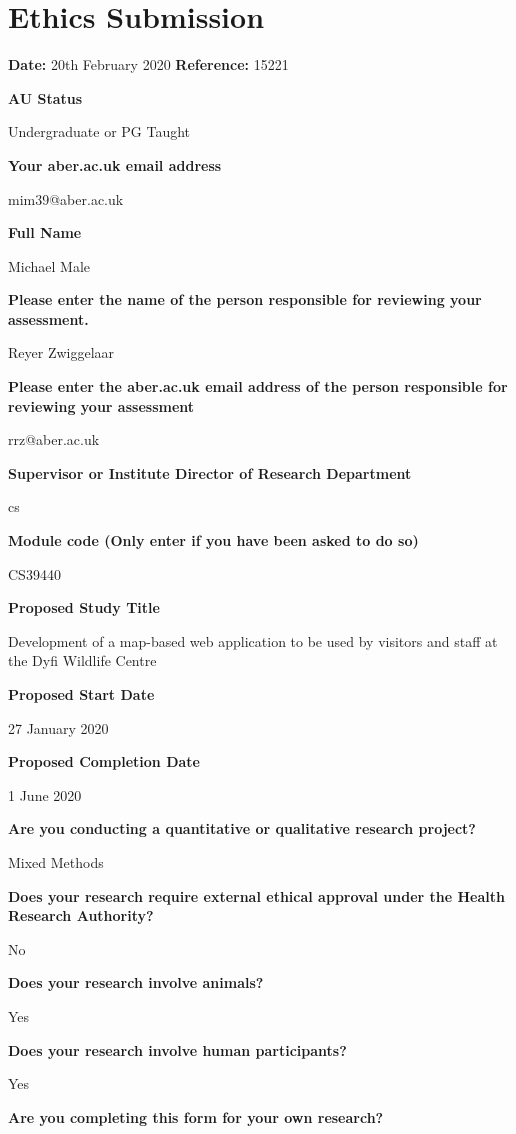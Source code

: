 \chapter{Ethics Submission}

\textbf{Date:} 20th February 2020
\textbf{Reference:} 15221

\textbf{AU Status}

Undergraduate or PG Taught

\textbf{Your aber.ac.uk email address}

mim39@aber.ac.uk

\textbf{Full Name}

Michael Male

\textbf{Please enter the name of the person responsible for reviewing your assessment.}

Reyer Zwiggelaar

\textbf{Please enter the aber.ac.uk email address of the person responsible for reviewing your assessment}

rrz@aber.ac.uk

\textbf{Supervisor or Institute Director of Research Department}

cs

\textbf{Module code (Only enter if you have been asked to do so)}

CS39440

\textbf{Proposed Study Title}

Development of a map-based web application to be used by visitors and staff at the Dyfi
Wildlife Centre

\textbf{Proposed Start Date}

27 January 2020

\textbf{Proposed Completion Date}

1 June 2020

\textbf{Are you conducting a quantitative or qualitative research project?}

Mixed Methods

\textbf{Does your research require external ethical approval under the Health Research Authority?}

No

\textbf{Does your research involve animals?}

Yes

\textbf{Does your research involve human participants?}

Yes

\textbf{Are you completing this form for your own research?}

